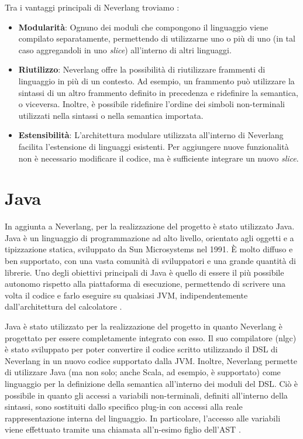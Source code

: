 \documentclass[12pt,a4paper,openright,twoside]{book}
\begin{document}
Tra i vantaggi principali di Neverlang troviamo \cite{Cazzola2012}:
\begin{itemize}
    \item \textbf{Modularità}: Ognuno dei moduli che compongono il linguaggio viene compilato separatamente, permettendo di utilizzarne uno o 
    più di uno (in tal caso aggregandoli in uno \textit{slice}) all’interno di altri linguaggi.
    \item \textbf{Riutilizzo}: Neverlang offre la possibilità di riutilizzare frammenti di linguaggio in più di un contesto. Ad esempio, un 
    frammento può utilizzare la sintassi di un altro frammento definito in precedenza e ridefinire la semantica, o viceversa. Inoltre, è 
    possibile ridefinire l’ordine dei simboli non-terminali utilizzati nella sintassi o nella semantica importata.
    \item \textbf{Estensibilità}: L’architettura modulare utilizzata all’interno di Neverlang facilita l’estensione di linguaggi esistenti. 
    Per aggiungere nuove funzionalità non è necessario modificare il codice, ma è sufficiente integrare un nuovo \textit{slice}.
\end{itemize}


\section{Java}
In aggiunta a Neverlang, per la realizzazione del progetto è stato utilizzato Java. Java è un linguaggio di programmazione ad alto livello, 
orientato agli oggetti e a tipizzazione statica, sviluppato da Sun Microsystems nel 1991. È molto diffuso e ben supportato, con una vasta 
comunità di sviluppatori e una grande quantità di librerie. Uno degli obiettivi principali di Java è quello di essere il più possibile 
autonomo rispetto alla piattaforma di esecuzione, permettendo di scrivere una volta il codice e farlo eseguire su qualsiasi \ac{JVM}, 
indipendentemente dall'architettura del calcolatore \cite{IBMWebsite}.

Java è stato utilizzato per la realizzazione del progetto in quanto Neverlang è progettato per essere completamente integrato con esso. Il suo 
compilatore (nlgc) è stato sviluppato per poter convertire il codice scritto utilizzando il DSL di Neverlang in un nuovo codice supportato 
dalla \ac{JVM}. Inoltre, Neverlang permette di utilizzare Java (ma non solo; anche Scala, ad esempio, è supportato) come linguaggio per la 
definizione della semantica all'interno dei moduli del \ac{DSL}. Ciò è possibile in quanto gli accessi a variabili non-terminali, definiti 
all'interno della sintassi, sono sostituiti dallo specifico plug-in con accessi alla reale rappresentazione interna del linguaggio. In 
particolare, l'accesso alle variabili viene effettuato tramite una chiamata all'n-esimo figlio dell'\ac{AST} \cite{Cazzola2013}.
\end{document}
